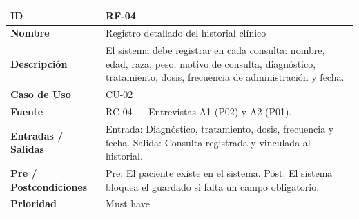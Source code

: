 \documentclass[
]{article}
\newcounter{none} %
\begin{document}
{\def\LTcaptype{none} %
\begin{longtable}[]{|
  >{\raggedright\arraybackslash}p{}|
  >{\raggedright\arraybackslash}p{}|}
\hline
\begin{minipage}[b]{\linewidth}\raggedright
\textbf{ID}
\end{minipage} & \begin{minipage}[b]{\linewidth}\raggedright
RF-04
\end{minipage} \\
\hline
\endhead
\hline
\endlastfoot
\textbf{Nombre} & \begin{minipage}[t]{\linewidth}\raggedright
Registro detallado del historial clínico
\end{minipage} \\
\hline
\textbf{Descripción} & \begin{minipage}[t]{\linewidth}\raggedright
El sistema debe registrar en cada consulta: nombre, edad, raza, peso, motivo de consulta, diagnóstico, tratamiento, dosis, frecuencia de administración y fecha.
\end{minipage} \\
\hline
\textbf{Caso de Uso} & \begin{minipage}[t]{\linewidth}\raggedright
CU-02
\end{minipage} \\
\hline
\textbf{Fuente} & \begin{minipage}[t]{\linewidth}\raggedright
RC-04 — Entrevistas A1 (P02) y A2 (P01).
\end{minipage} \\
\hline
\textbf{Entradas / Salidas} & \begin{minipage}[t]{\linewidth}\raggedright
Entrada: Diagnóstico, tratamiento, dosis, frecuencia y fecha. Salida: Consulta registrada y vinculada al historial.
\end{minipage} \\
\hline
\textbf{Pre / Postcondiciones} & \begin{minipage}[t]{\linewidth}\raggedright
Pre: El paciente existe en el sistema. Post: El sistema bloquea el guardado si falta un campo obligatorio.
\end{minipage} \\
\hline
\textbf{Prioridad} & \begin{minipage}[t]{\linewidth}\raggedright
Must have
\end{minipage} \\

\end{longtable}}
\end{document}
